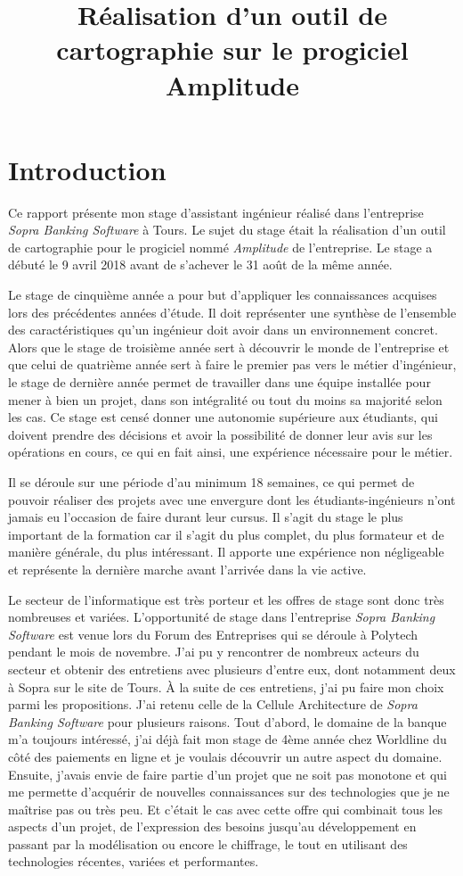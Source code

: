 \documentclass{polytech/polytech}
\title{Réalisation d'un outil de cartographie sur le progiciel Amplitude}
\begin{document}
\chapter*{Introduction}


Ce rapport présente mon stage d'assistant ingénieur réalisé dans l'entreprise \textit{Sopra Banking Software} à Tours. Le sujet du stage était la réalisation d'un outil de cartographie pour le progiciel nommé \textit{Amplitude} de l'entreprise. Le stage a débuté le 9 avril 2018 avant de s'achever le 31 août de la même année.

Le stage de cinquième année a pour but d'appliquer les connaissances acquises lors des précédentes années d'étude. Il doit représenter une synthèse de l'ensemble des caractéristiques qu'un ingénieur doit avoir dans un environnement concret. Alors que le stage de troisième année sert à découvrir le monde de l'entreprise et que celui de quatrième année sert à faire le premier pas vers le métier d'ingénieur, le stage de dernière année permet de travailler dans une équipe installée pour mener à bien un projet, dans son intégralité ou tout du moins sa majorité selon les cas. Ce stage est censé donner une autonomie supérieure aux étudiants, qui doivent prendre des décisions et avoir la possibilité de donner leur avis sur les opérations en cours, ce qui en fait ainsi, une expérience nécessaire pour le métier. 

Il se déroule sur une période d'au minimum 18 semaines, ce qui permet de pouvoir réaliser des projets avec une envergure dont les étudiants-ingénieurs n'ont jamais eu l'occasion de faire durant leur cursus. Il s'agit du stage le plus important de la formation car il s'agit du plus complet, du plus formateur et de manière générale, du plus intéressant. Il apporte une expérience non négligeable et représente la dernière marche avant l'arrivée dans la vie active.

Le secteur de l'informatique est très porteur et les offres de stage sont donc très nombreuses et variées. L'opportunité de stage dans l'entreprise \textit{Sopra Banking Software} est venue lors du Forum des Entreprises qui se déroule à Polytech pendant le mois de novembre. J'ai pu y rencontrer de nombreux acteurs du secteur et obtenir des entretiens avec plusieurs d'entre eux, dont notamment deux à Sopra sur le site de Tours. À la suite de ces entretiens, j'ai pu faire mon choix parmi les propositions. J'ai retenu celle de la Cellule Architecture de \textit{Sopra Banking Software} pour plusieurs raisons. Tout d'abord, le domaine de la banque m'a toujours intéressé, j'ai déjà fait mon stage de 4ème année chez Worldline du côté des paiements en ligne et je voulais découvrir un autre aspect du domaine. Ensuite, j'avais envie de faire partie d'un projet que ne soit pas monotone et qui me permette d'acquérir de nouvelles connaissances sur des technologies que je ne maîtrise pas ou très peu. Et c'était le cas avec cette offre qui combinait tous les aspects d'un projet, de l'expression des besoins jusqu'au développement en passant par la modélisation ou encore le chiffrage, le tout en utilisant des technologies récentes, variées et performantes. 
\end{document}
